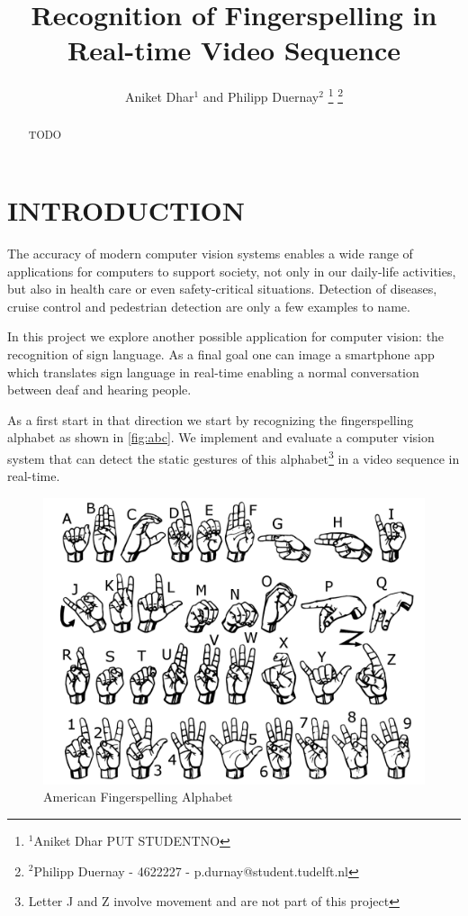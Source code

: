 \documentclass[letterpaper, 10 pt, conference]{ieeeconf}  %
\title{\LARGE \bf
Recognition of Fingerspelling in Real-time Video Sequence
}
\author{Aniket Dhar$^{1}$ and Philipp Duernay$^{2}$%
\thanks{$^{1}$Aniket Dhar PUT STUDENTNO}%
\thanks{$^{2}$Philipp Duernay - 4622227 - p.durnay@student.tudelft.nl}%
}
\begin{document}
\maketitle
\thispagestyle{empty}
\pagestyle{empty}


\begin{abstract}

TODO

\end{abstract}


\section{INTRODUCTION}

The accuracy of modern computer vision systems enables a wide range of applications for computers to support society, not only in our daily-life activities, but also in health care or even safety-critical situations. Detection of diseases, cruise control and pedestrian detection are only a few examples to name. 

In this project we explore another possible application for computer vision: the recognition of sign language. As a final goal one can image a smartphone app which translates sign language in real-time enabling a normal conversation between deaf and hearing people.

As a first start in that direction we start by recognizing the fingerspelling alphabet as shown in \autoref{fig:abc}. We implement and evaluate a computer vision system that can detect the static gestures of this alphabet\footnote{Letter J and Z involve movement and are not part of this project} in a video sequence in real-time. 

\begin{figure}[hb]
\centering
\includegraphics[width=0.8\linewidth]{abc.png}
\caption{American Fingerspelling Alphabet}
\label{fig:abc}
\end{figure}
\end{document}
